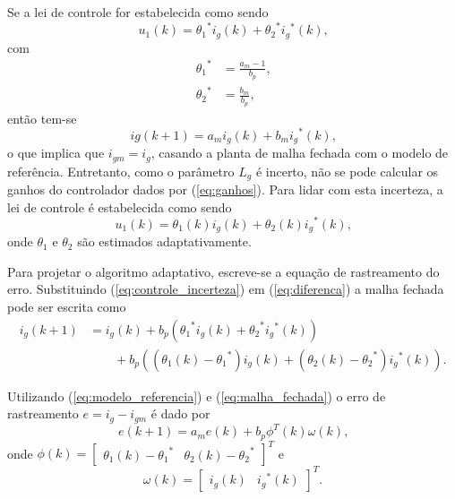     Se a lei de controle for estabelecida como sendo
    \begin{equation}
        u_1 (k) = {\theta_1}^* i_g (k) + {\theta_2}^* {i_g}^* (k) \text{,}
    \end{equation}
    com
    \begin{equation}
        \begin{split}
            {\theta_1}^* & = \frac{a_m - 1}{b_p} \text{,}\\
            {\theta_2}^* & = \frac{b_m}{b_p} \text{,}
        \end{split}
        \label{eq:ganhos}
    \end{equation}
    então tem-se
    \begin{equation}
        ig (k + 1) = a_m i_g (k) + b_m {i_g}^* (k) \text{,}
    \end{equation}
    o que implica que $i_{gm} = i_g$, casando a planta de malha fechada com o
    modelo de referência. Entretanto, como o parâmetro $L_g$ é incerto, não se pode
    calcular os ganhos do controlador dados por (\ref{eq:ganhos}). Para lidar
    com esta incerteza, a lei de controle é estabelecida como sendo
    \begin{equation}
        u_1 (k) = \theta_1 (k) i_g (k) + \theta_2 (k) {i_g}^* (k) \text{,}
        \label{eq:controle_incerteza}
    \end{equation}
    onde $\theta_1$ e $\theta_2$ são estimados adaptativamente.

    Para projetar o algoritmo adaptativo, escreve-se a equação de rastreamento do erro.
    Substituindo (\ref{eq:controle_incerteza}) em (\ref{eq:diferenca}) a malha fechada
    pode ser escrita como
    \begin{equation}
        \begin{split}
        i_g (k + 1) &= i_g (k) + b_p \left( {\theta_1}^* i_g (k) + {\theta_2}^* {i_g}^*
            (k) \right)\\
            &\qquad {}+ b_p \left( (\theta_1 (k) - {\theta_1}^*) i_g (k) + ( \theta_2 (k)
            - {\theta_2}^*) {i_g}^* (k) \right) \text{.}
        \end{split}
        \label{eq:malha_fechada}
    \end{equation}

    Utilizando (\ref{eq:modelo_referencia}) e (\ref{eq:malha_fechada}) o erro de
    rastreamento $e = i_g - i_{gm}$ é dado por
    \begin{equation}
        e (k+1) = a_m e(k) + b_p \phi^T (k) \omega (k) \text{,}
        \label{eq:erro_rastreamento}
    \end{equation}
    onde $\phi (k) = {\left[ \begin{matrix} \theta_1 (k) - {\theta_1}^* & \theta_2 (k) - {\theta_2}^*
    \end{matrix} \right]}^T$ e
    \begin{equation}
        \omega (k) = {\left[ \begin{matrix} i_g (k) & {i_g}^* (k) \end{matrix} \right]}^T \text{.}
        \label{eq:omega_k}
    \end{equation}

